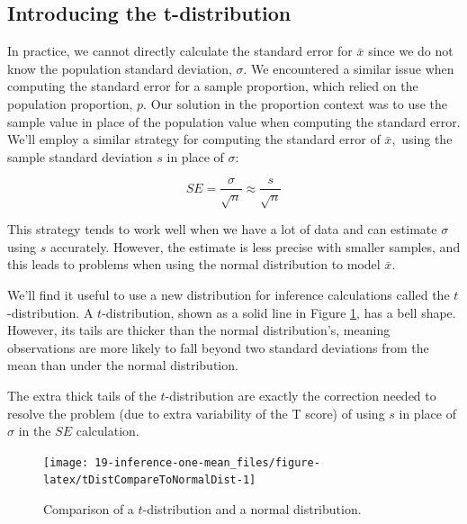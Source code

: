 \documentclass[
  10pt,
  openany]{book}
\begin{document}

\hypertarget{introducing-the-t-distribution}{%
\subsection{Introducing the t-distribution}\label{introducing-the-t-distribution}}


In practice, we cannot directly calculate the standard error for \(\bar{x}\) since we do not know the population standard deviation, \(\sigma.\) We encountered a similar issue when computing the standard error for a sample proportion, which relied on the population proportion, \(p.\) Our solution in the proportion context was to use the sample value in place of the population value when computing the standard error.
We'll employ a similar strategy for computing the standard error of \(\bar{x},\) using the sample standard deviation \(s\) in place of \(\sigma:\)

\[SE = \frac{\sigma}{\sqrt{n}} \approx \frac{s}{\sqrt{n}}\]

This strategy tends to work well when we have a lot of data and can estimate \(\sigma\) using \(s\) accurately.
However, the estimate is less precise with smaller samples, and this leads to problems when using the normal distribution to model \(\bar{x}.\)

We'll find it useful to use a new distribution for inference calculations called the \(t\)-distribution.
A \(t\)-distribution, shown as a solid line in Figure \ref{fig:tDistCompareToNormalDist}, has a bell shape.
However, its tails are thicker than the normal distribution's, meaning observations are more likely to fall beyond two standard deviations from the mean than under the normal distribution.

The extra thick tails of the \(t\)-distribution are exactly the correction needed to resolve the problem (due to extra variability of the T score) of using \(s\) in place of \(\sigma\) in the \(SE\) calculation.

\begin{figure}[h]

{\centering \texttt{[image: 19-inference-one-mean\_files/figure-latex/tDistCompareToNormalDist-1]} 

}

\caption{Comparison of a $t$-distribution and a normal distribution.}\label{fig:tDistCompareToNormalDist}
\end{figure}
\end{document}
